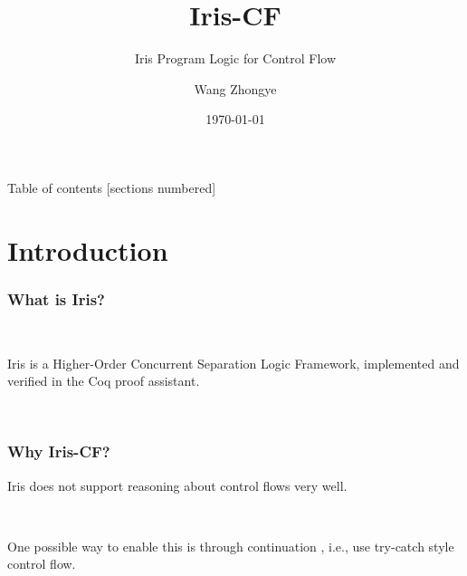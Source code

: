 \documentclass[10pt]{beamer}
\title{Iris-CF}
\subtitle{Iris Program Logic for Control Flow}
\date{\today}
\author{Wang Zhongye}
\newcommand{\blue}[1]{{\color[rgb]{0, 0, 1} #1}}
\begin{document}
\maketitle

\begin{frame}{Table of contents}
  [sections numbered]
  \tableofcontents[hideallsubsections]
\end{frame}

\section{Introduction}

\begin{frame}
\frametitle{What is Iris?}

\

Iris \cite{jung2017iris} is a Higher-Order Concurrent Separation Logic Framework,
implemented and verified in the Coq proof assistant.

\



\end{frame}

\begin{frame}
\frametitle{Why Iris-CF?}

Iris does not support reasoning about control flows very well.

\

One possible way to enable this is through continuation \cite{timany2019mechanized}, i.e., use try-catch style control flow.


\





\end{frame}
\end{document}
